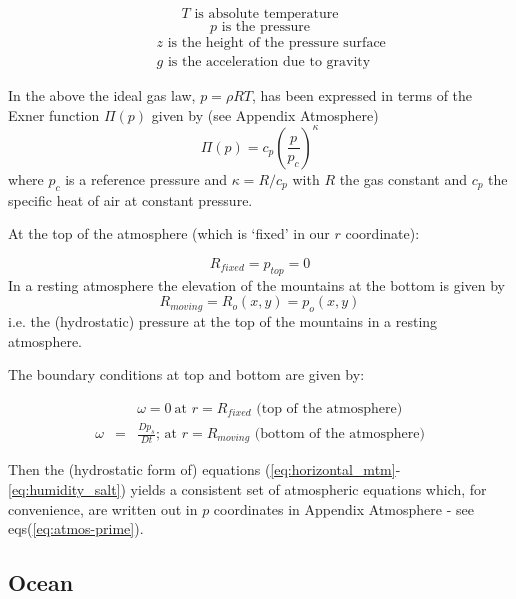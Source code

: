 \begin{equation*}
T\text{ is absolute temperature}
\end{equation*}
\begin{equation*}
p\text{ is the pressure}
\end{equation*}
\begin{eqnarray*}
&&z\text{ is the height of the pressure surface} \\
&&g\text{ is the acceleration due to gravity}
\end{eqnarray*}

In the above the ideal gas law, $p=\rho RT$, has been expressed in terms of
the Exner function $\Pi (p)$ given by (see Appendix Atmosphere) 
\begin{equation}
\Pi (p)=c_{p}(\frac{p}{p_{c}})^{\kappa }  \label{eq:exner}
\end{equation}
where $p_{c}$ is a reference pressure and $\kappa =R/c_{p}$ with $R$ the gas
constant and $c_{p}$ the specific heat of air at constant pressure.

At the top of the atmosphere (which is `fixed' in our $r$ coordinate):

\begin{equation*}
R_{fixed}=p_{top}=0
\end{equation*}
In a resting atmosphere the elevation of the mountains at the bottom is
given by 
\begin{equation*}
R_{moving}=R_{o}(x,y)=p_{o}(x,y)
\end{equation*}
i.e. the (hydrostatic) pressure at the top of the mountains in a resting
atmosphere.

The boundary conditions at top and bottom are given by:

\begin{eqnarray}
&&\omega =0~\text{at }r=R_{fixed} \text{ (top of the atmosphere)}
\label{eq:fixed-bc-atmos} \\
\omega &=&\frac{Dp_{s}}{Dt}\text{; at }r=R_{moving}\text{ (bottom of the
atmosphere)}  \label{eq:moving-bc-atmos}
\end{eqnarray}

Then the (hydrostatic form of) equations (\ref{eq:horizontal_mtm}-\ref{eq:humidity_salt}) 
yields a consistent set of atmospheric equations which, for convenience, are written out in $p$
coordinates in Appendix Atmosphere - see eqs(\ref{eq:atmos-prime}).

\subsection{Ocean}


